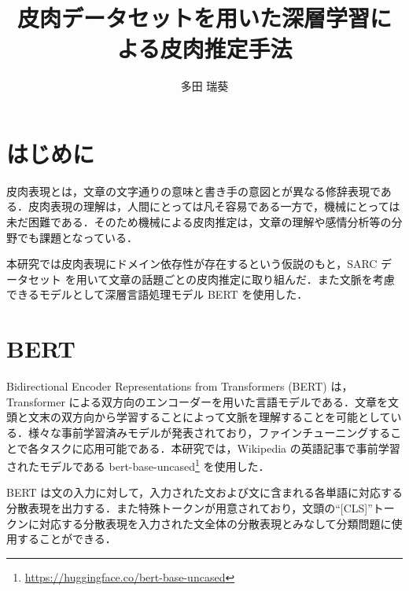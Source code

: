 \documentclass[a4paper,twoside,twocolumn,10pt]{article}
\title{皮肉データセットを用いた深層学習による皮肉推定手法}
\author{多田 瑞葵}
\begin{document}
\maketitle  %
\small


\section{はじめに}
皮肉表現とは，文章の文字通りの意味と書き手の意図とが異なる修辞表現である．皮肉表現の理解は，人間にとっては凡そ容易である一方で，機械にとっては未だ困難である．そのため機械による皮肉推定は，文章の理解や感情分析等の分野でも課題となっている．\par
本研究では皮肉表現にドメイン依存性が存在するという仮説のもと，SARC データセット \cite{khodak-etal-2018-large} を用いて文章の話題ごとの皮肉推定に取り組んだ．また文脈を考慮できるモデルとして深層言語処理モデル BERT \cite{DBLP} を使用した．


\section{BERT}
Bidirectional Encoder Representations from Transformers (BERT) は，Transformer による双方向のエンコーダーを用いた言語モデルである．文章を文頭と文末の双方向から学習することによって文脈を理解することを可能としている．様々な事前学習済みモデルが発表されており，ファインチューニングすることで各タスクに応用可能である．本研究では，Wikipedia の英語記事で事前学習されたモデルである bert-base-uncased\footnote{\url{https://huggingface.co/bert-base-uncased}} を使用した．\par
BERT は文の入力に対して，入力された文および文に含まれる各単語に対応する分散表現を出力する．また特殊トークンが用意されており，文頭の“[CLS]”トークンに対応する分散表現を入力された文全体の分散表現とみなして分類問題に使用することができる．\par



\end{document}
